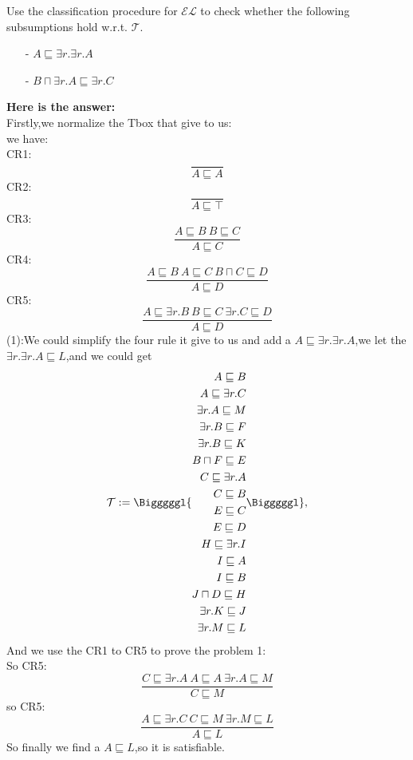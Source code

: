 \documentclass{article}
\begin{document}
    Use the classification procedure for $\mathcal{EL}$ to check whether the following subsumptions hold w.r.t. $\mathcal{T}$.
    \begin{itemize}
    \item[-] $A\sqsubseteq\exists r.\exists r.A$
    \item[-] $B\sqcap\exists r.A\sqsubseteq\exists r.C$
    \end{itemize}
    \textbf{Here is the answer:}\\
    Firstly,we normalize the Tbox that give to us:\\
    we have:\\
    CR1:\[  \frac{}{A \sqsubseteq A}\]
    CR2:\[  \frac{}{A \sqsubseteq \top}\]
    CR3:\[  \frac{A \sqsubseteq B\ B\sqsubseteq C} {A \sqsubseteq C}\]
    CR4:\[  \frac{A\sqsubseteq B\ A\sqsubseteq C\ B\sqcap C\sqsubseteq D}{A \sqsubseteq D}\]
    CR5:\[  \frac{A\sqsubseteq \exists r.B\ B \sqsubseteq C\ \exists r.C\sqsubseteq D}{A \sqsubseteq D}\]
    (1):We could simplify the four rule it give to us and add a $A\sqsubseteq\exists r.\exists r.A$,we let 
    the $\exists r.\exists r.A \sqsubseteq L$,and we could get\\
    \begin{equation*}
        \mathcal{T}:=\Bigggggl\{
        \begin{aligned} 
        A \sqsubseteq B\\
        A \sqsubseteq \exists r.C\\
        \exists r.A \sqsubseteq M\\
        \exists r.B \sqsubseteq F\\
        \exists r.B \sqsubseteq K\\
        B \sqcap F \sqsubseteq E\\
        C \sqsubseteq \exists r.A \\
        C \sqsubseteq B\\
        E \sqsubseteq C\\
        E \sqsubseteq D\\
        H \sqsubseteq \exists r.I\\
        I \sqsubseteq A\\
        I \sqsubseteq B\\
        J \sqcap D\sqsubseteq H\\
        \exists r.K \sqsubseteq J\\
        \exists r.M \sqsubseteq L
        \end{aligned}
        \Bigggggl\},
    \end{equation*}
    And we use the CR1 to CR5 to prove the problem 1:\\
    So CR5:\[   \frac{C \sqsubseteq \exists r.A\ A\sqsubseteq A\ \exists r.A \sqsubseteq M}{C \sqsubseteq M}\]
    so CR5:\[   \frac{A \sqsubseteq \exists r.C\ C\sqsubseteq M\ \exists r.M \sqsubseteq L}{A \sqsubseteq L}\]
    So finally we find a $A\sqsubseteq L$,so it is satisfiable.\\
\end{document}
